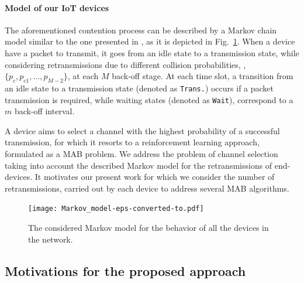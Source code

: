 \paragraph{Model of our IoT devices}

The aforementioned contention process can be described by a Markov chain model \cite{Norris98} similar to the one presented in \cite{Yang12}, as it is depicted in Fig.~\ref{fig:43:Markov_model}.
When a device have a packet to transmit, it goes from an idle state to a transmission state, while considering retransmissions due to different collision probabilities, \ie, $\{p_{c}, p_{c1}, \dots, p_{M-2} \}$, at each $M$ back-off stage.
At each time slot, a transition from an idle state to a transmission state (denoted as \texttt{Trans.}) occurs if a packet transmission is required, while waiting states (denoted as \texttt{Wait}), correspond to a $m$ back-off interval.

A device aims to select a channel with the highest probability of a successful transmission, for which it resorts to a reinforcement learning approach, formulated as a MAB problem.
%
We address the problem of channel selection taking into account the described Markov model for the retransmissions of end-devices.
It motivates our present work for which we consider the number of retransmissions, carried out by each device to address several MAB algorithms.

\begin{figure}[htp!]  %
	\centering
	\texttt{[image: Markov\_model-eps-converted-to.pdf]}
	\caption{The considered Markov model for the behavior of all the devices in the network.}
	\label{fig:43:Markov_model}
\end{figure}
%

\subsection{Motivations for the proposed approach}
\label{sub:43:motivations}

